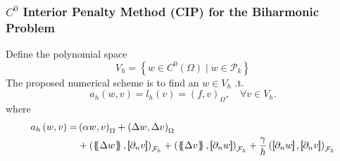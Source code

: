 \begin{frame}
\frametitle{ $C^0$ Interior Penalty Method (CIP) for the Biharmonic Problem }

\begin{block}{}
    Define the polynomial space \begin{equation}
        V_{h} = \left\{ w \in C^{0}( \Omega )  \mid    w \in  \mathcal{P}_{k}  \right\}
    \end{equation}
The proposed numerical scheme is to find an  $w \in V_{h}$ .t.
\begin{equation*}
a_{h}( w, v )   = l_{h}( v) = ( f,v)_{\Omega } , \quad \forall v \in V_{h}  .
\end{equation*}
where
\begin{equation*}
\begin{split}
a_{h} \left( w, v \right)   =&
    \left( \alpha  w, v \right) _{\Omega }   +  \left( \Delta  w, \Delta v \right) _{\Omega } \\
 & +
  \left( \mean{  \Delta  w }, \jump{ \partial _{n }v} \right)_{\mathcal{F}_{h}}  +
 \left( \mean{ \Delta  v }, \jump{ \partial _{n}w }      \right)_{\mathcal{F}_{h}}  + \frac{\gamma }{h}  \left( \jump{ \partial _{n} w}, \jump{ \partial _{n} v   }   \right)_{\mathcal{F}_{h}}
\end{split}
\end{equation*}


\end{block}


\end{frame}


